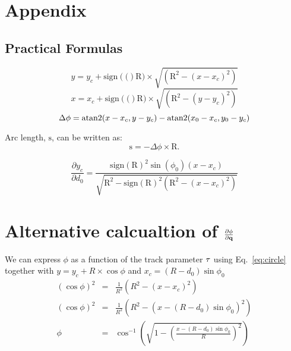 \documentclass{article}
\def\R{\ensuremath{\mathrm{R}}}
\def\dphi{\ensuremath{\Delta\phi}}
\def\phione{\ensuremath{\mathrm{atan2}(x_0-x_c,y_0-y_c)}}
\def\phitwo{\ensuremath{\mathrm{atan2}(x-x_c,y-y_c)}}
\def\sign#1{\ensuremath{\mathrm{sign}\left(#1\right)}}
\def\sinphizero{\ensuremath{\sin\left(\phi_0\right)}}
\def\signR{\sign{\R}}
\def\vec#1{\ensuremath{\mathrm{\bf #1}}}
\def\qvec{\ensuremath{\mathrm{\bf q}}}
\def\partder#1#2{\ensuremath{\frac{\partial #1}{\partial #2}}}
\begin{document}
\newpage







\appendix

\section*{Appendix}
\subsection*{Practical Formulas}

\begin{equation}
y = y_c + \sign(\R)\times\sqrt{\left( \R^2 - \left(x-x_c\right)^2   \right)} \label{eq:yofx}
\end{equation}
\begin{equation}
x = x_c + \sign(\R)\times\sqrt{\left( \R^2 - \left(y-y_c\right)^2   \right)} \label{eq:xofy}
\end{equation}
\begin{equation}
\dphi = \phitwo - \phione \label{eq:dphi} \\
\end{equation}


Arc length, $\mathrm{s}$, can be written as:
\begin{equation}
\mathrm{s} = -\dphi \times \R .
\label{eq:sl}
\end{equation}


\begin{equation}
        \partder{y_c}{d_0} = \frac{ \signR^2\sinphizero\left(x-x_c\right) } 
{\sqrt{ \R^2 - \signR^2\left(\R^2 - \left( x-x_c\right)^2\right)}  }
\label{eq:df_dd0}
%        
\end{equation}






\section*{Alternative calcualtion of $\partder{\phi}{\qvec}$}
We can express $\phi$ as a function of the track parameter $\vec{\tau}$  
using Eq.~\ref{eq:circle} together with $y=y_c+R\times\cos\phi$ and $x_c=(R-d_0)\sin\phi_0$
\begin{eqnarray}
\left( \cos\phi \right)^2 &=& \frac{1}{R^2}\left( R^2 - \left( x-x_c \right)^2 \right) \nonumber \\ 
\left( \cos\phi \right)^2 &=& \frac{1}{R^2}\left( R^2 - \left( x-(R-d_0)\sin\phi_0 \right)^2 \right) \nonumber \\ 
\phi &=& \cos^{-1}\left( \sqrt{ 1 -  \left( \frac{  x-(R-d_0)\sin\phi_0}{R} \right)^2    }    \right) \label{eq:phifromcos}
\end{eqnarray}
\end{document}
